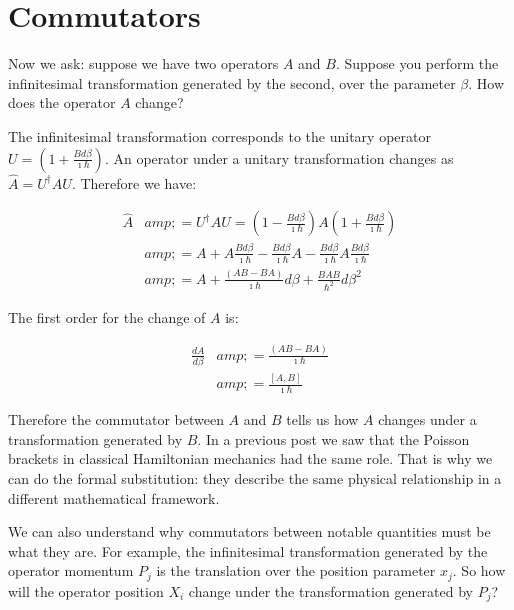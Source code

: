 \documentclass[aps,pra,10pt,floatfix,nofootinbib]{revtex4-1}
\theoremstyle{definition}
\begin{document}
\section{Commutators}

Now we ask: suppose we have two operators $A$ and $B$. Suppose you perform the infinitesimal transformation generated by the second, over the parameter $\beta$. How does the operator $A$ change?

The infinitesimal transformation corresponds to the unitary operator $U=(1 + \frac{B d\beta}{\imath \hbar})$. An operator under a unitary transformation changes as $\hat{A} = U^\dagger A U$. Therefore we have:

\begin{equation}
\begin{aligned}
\hat{A}&amp;=U^\dagger A U = (1 - \frac{B d\beta}{\imath \hbar}) A (1 + \frac{B d\beta}{\imath \hbar}) \\
&amp;=A + A \frac{B d\beta}{\imath \hbar} - \frac{B d\beta}{\imath \hbar} A - \frac{B d\beta}{\imath \hbar} A \frac{B d\beta}{\imath \hbar} \\
&amp;=A + \frac{(AB - BA)}{\imath \hbar}d\beta + \frac{BAB}{\hbar^2}d\beta^2
\end{aligned}
\end{equation}

The first order for the change of $A$ is:

\begin{equation}
\begin{aligned}
\frac{dA}{d\beta}&amp;=\frac{(AB - BA)}{\imath \hbar} \\
&amp;= \frac{[A,B]}{\imath \hbar}
\end{aligned}
\end{equation}

Therefore the commutator between $A$ and $B$ tells us how $A$ changes under a transformation generated by $B$. In a previous post we saw that the Poisson brackets in classical Hamiltonian mechanics had the same role. That is why we can do the formal substitution: they describe the same physical relationship in a different mathematical framework.

We can also understand why commutators between notable quantities must be what they are. For example, the infinitesimal transformation generated by the operator momentum $P_j$ is the translation over the position parameter $x_j$. So how will the operator position $X_i$ change under the transformation generated by $P_j$?
\end{document}
